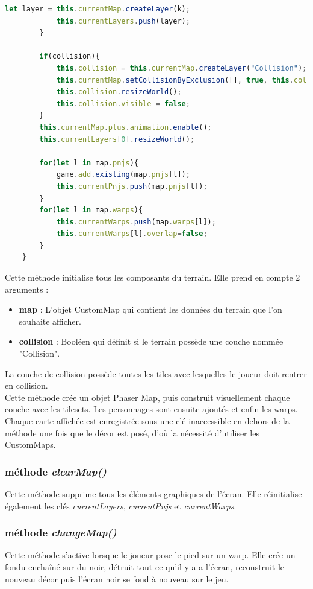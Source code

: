 \documentclass[11pt]{article}
\begin{document}
\begin{appendices}
\begin{lstlisting}[language=JavaScript]
            let layer = this.currentMap.createLayer(k);
            this.currentLayers.push(layer);
        }

        if(collision){
            this.collision = this.currentMap.createLayer("Collision");
            this.currentMap.setCollisionByExclusion([], true, this.collision);
            this.collision.resizeWorld();
            this.collision.visible = false;
        }
        this.currentMap.plus.animation.enable();
        this.currentLayers[0].resizeWorld();

        for(let l in map.pnjs){
            game.add.existing(map.pnjs[l]);
            this.currentPnjs.push(map.pnjs[l]);
        }
        for(let l in map.warps){
            this.currentWarps.push(map.warps[l]);
            this.currentWarps[l].overlap=false;
        }
    }
\end{lstlisting} 
Cette méthode initialise tous les composants du terrain. Elle prend en compte 2 arguments :
\begin{itemize}
\item \textbf{map} : L'objet CustomMap qui contient les données du terrain que l'on souhaite afficher. 
\item \textbf{collision} : Booléen qui définit si le terrain possède une couche nommée "Collision".
\end{itemize}
La couche de collision possède toutes les tiles avec lesquelles le joueur doit rentrer en collision. \\

Cette méthode crée un objet Phaser Map, puis construit visuellement chaque couche avec les tilesets. Les personnages sont ensuite ajoutés et enfin les warps. Chaque carte affichée est enregistrée sous une clé inaccessible en dehors de la méthode une fois que le décor est posé, d'où la nécessité d'utiliser les CustomMaps.
\subsubsection{méthode \textit{clearMap()}}
Cette méthode supprime tous les éléments graphiques de l'écran. Elle réinitialise également les clés \textit{currentLayers}, \textit{currentPnjs} et \textit{currentWarps}.
\subsubsection{méthode \textit{changeMap()}}
Cette méthode s'active lorsque le joueur pose le pied sur un warp. 
Elle crée un fondu enchaîné sur du noir, détruit tout ce qu'il y a a l'écran, reconstruit le nouveau décor puis l'écran noir se fond à nouveau sur le jeu.\\


\end{appendices}
\end{document}
